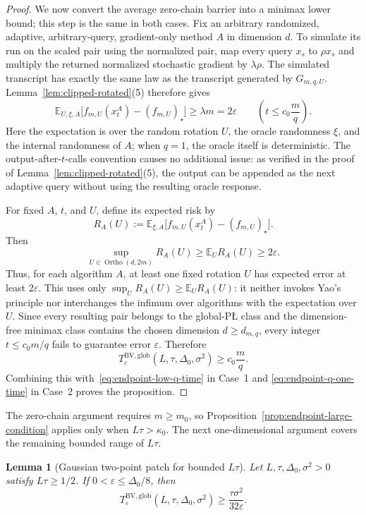 \documentclass[11pt]{article}
\newtheorem{lemma}[theorem]{Lemma}
\newcommand{\E}{\mathbb{E}}
\newcommand{\Ortho}{\operatorname{Ortho}}
\begin{document}
\begin{proof}
We now convert the average zero-chain barrier into a minimax lower bound; this step is the same in both cases. Fix an
arbitrary randomized, adaptive, arbitrary-query, gradient-only method $A$ in dimension $d$. To simulate its run on
the scaled pair using the normalized pair, map every query $x_s$ to $\rho x_s$ and multiply the returned normalized
stochastic gradient by $\lambda\rho$. The simulated transcript has exactly the same law as the transcript generated
by $G_{m,q,U}$. Lemma~\ref{lem:clipped-rotated}(5) therefore gives
\[
\E_{U,\xi,A}\bigl[f_{m,U}(x_t^A)-(f_{m,U})_\star\bigr]
\ge
\lambda m
=
2\varepsilon
\qquad
\left(t\le c_0\frac{m}{q}\right).
\]
Here the expectation is over the random rotation $U$, the oracle randomness $\xi$, and the internal randomness of
$A$; when $q=1$, the oracle itself is deterministic. The output-after-$t$-calls convention causes no additional
issue: as verified in the proof of Lemma~\ref{lem:clipped-rotated}(5), the output can be appended as the next adaptive
query without using the resulting oracle response.

For fixed $A$, $t$, and $U$, define its expected risk by
\[
R_A(U):=
\E_{\xi,A}\bigl[f_{m,U}(x_t^A)-(f_{m,U})_\star\bigr].
\]
Then
\[
\sup_{U\in\Ortho(d,2m)}R_A(U)
\ge
\E_U R_A(U)
\ge2\varepsilon.
\]
Thus, for each algorithm $A$, at least one fixed rotation $U$ has expected error at least $2\varepsilon$. This uses
only $\sup_U R_A(U)\ge\E_U R_A(U)$: it neither invokes Yao's principle nor interchanges the infimum over algorithms
with the expectation over $U$. Since every resulting pair belongs to the global-P\L{} class and the dimension-free minimax class contains
the chosen dimension $d\ge d_{m,q}$, every integer $t\le c_0m/q$ fails to guarantee error $\varepsilon$. Therefore
\begingroup
\[
T_\varepsilon^{\mathrm{BV,glob}}(L,\tau,\Delta_0,\sigma^2)
\ge
c_0\frac{m}{q}.
\]
\endgroup
Combining this with~\eqref{eq:endpoint-low-q-time} in Case~1 and
\eqref{eq:endpoint-q-one-time} in Case~2 proves the proposition.
\end{proof}

The zero-chain argument requires $m\ge m_0$, so Proposition~\ref{prop:endpoint-large-condition} applies only when
$L\tau>\kappa_0$. The next one-dimensional argument covers the remaining bounded range of $L\tau$.

\begingroup
\begin{lemma}[Gaussian two-point patch for bounded $L\tau$]
\label{lem:endpoint-gaussian-two-point}
Let $L,\tau,\Delta_0,\sigma^2>0$ satisfy $L\tau\ge1/2$. If
$0<\varepsilon\le\Delta_0/8$, then
\[
T_\varepsilon^{\mathrm{BV,glob}}(L,\tau,\Delta_0,\sigma^2)
\ge
\frac{\tau\sigma^2}{32\varepsilon}.
\]
\end{lemma}
\endgroup
\end{document}
